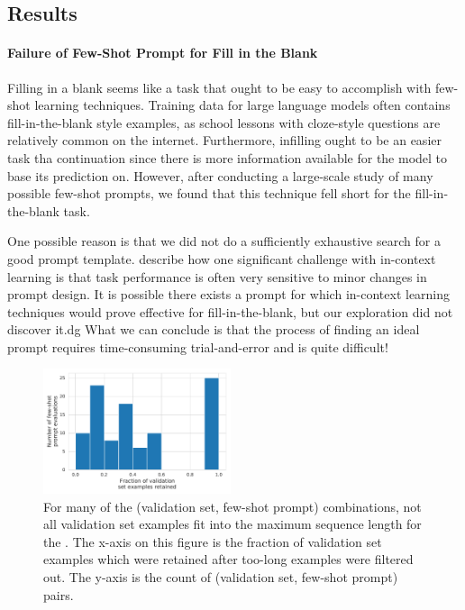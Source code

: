 \subsection{Results}

\paragraph{Failure of Few-Shot Prompt for Fill in the Blank}
Filling in a blank seems like a task that ought to be easy to accomplish with few-shot learning techniques.
Training data for large language models often contains fill-in-the-blank style examples, as school lessons with cloze-style questions are relatively common on the internet.
Furthermore, infilling ought to be an easier task tha continuation since there is more information available for the model to base its prediction on.
However, after conducting a large-scale study of many possible few-shot prompts, we found that this technique fell short for the fill-in-the-blank task.

One possible reason is that we did not do a sufficiently exhaustive search for a good prompt template.
\citet{zhao2021calibrate} describe how one significant challenge with in-context learning is that task performance is often very sensitive to minor changes in prompt design.
It is possible there exists a prompt for which in-context learning techniques would prove effective for fill-in-the-blank, but our exploration did not discover it.dg
What we can conclude is that the process of finding an ideal prompt requires time-consuming trial-and-error and is quite difficult!

\begin{figure}
    \centering
    \includegraphics[width=0.49\textwidth]{figures/fs_eval_sets_sizes}
    \caption{For many of the (validation set, few-shot prompt) combinations, not all validation set examples fit into the maximum sequence length for the \LLM.
    The x-axis on this figure is the fraction of validation set examples which were retained after too-long examples were filtered out.
    The y-axis is the count of (validation set, few-shot prompt) pairs.}
    \label{fig:skipped_fs_examples}
\end{figure}


